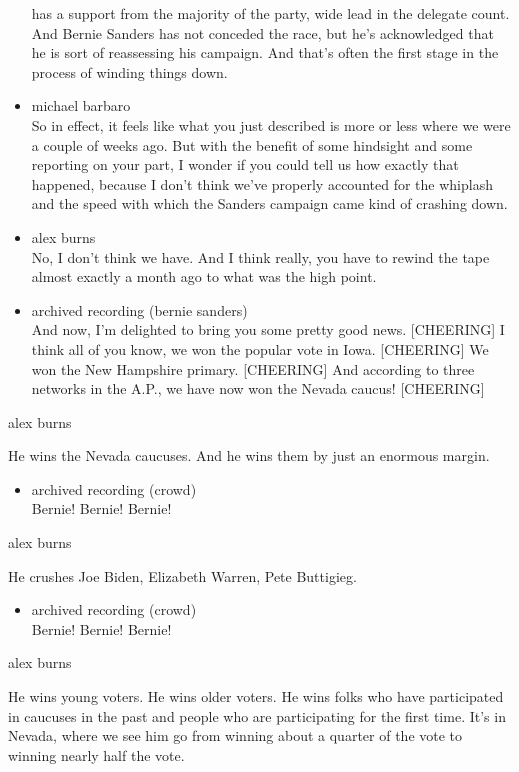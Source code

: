 \begin{itemize}
  has a support from the majority of the party, wide lead in the
  delegate count. And Bernie Sanders has not conceded the race, but he's
  acknowledged that he is sort of reassessing his campaign. And that's
  often the first stage in the process of winding things down.
\item
  michael barbaro\\
  So in effect, it feels like what you just described is more or less
  where we were a couple of weeks ago. But with the benefit of some
  hindsight and some reporting on your part, I wonder if you could tell
  us how exactly that happened, because I don't think we've properly
  accounted for the whiplash and the speed with which the Sanders
  campaign came kind of crashing down.
\item
  alex burns\\
  No, I don't think we have. And I think really, you have to rewind the
  tape almost exactly a month ago to what was the high point.
\item
  archived recording (bernie sanders)\\
  And now, I'm delighted to bring you some pretty good news.
  {[}CHEERING{]} I think all of you know, we won the popular vote in
  Iowa. {[}CHEERING{]} We won the New Hampshire primary. {[}CHEERING{]}
  And according to three networks in the A.P., we have now won the
  Nevada caucus! {[}CHEERING{]}
\end{itemize}

alex burns

He wins the Nevada caucuses. And he wins them by just an enormous
margin.

\begin{itemize}
\tightlist
\item
  archived recording (crowd)\\
  Bernie! Bernie! Bernie!
\end{itemize}

alex burns

He crushes Joe Biden, Elizabeth Warren, Pete Buttigieg.

\begin{itemize}
\tightlist
\item
  archived recording (crowd)\\
  Bernie! Bernie! Bernie!
\end{itemize}

alex burns

He wins young voters. He wins older voters. He wins folks who have
participated in caucuses in the past and people who are participating
for the first time. It's in Nevada, where we see him go from winning
about a quarter of the vote to winning nearly half the vote.


